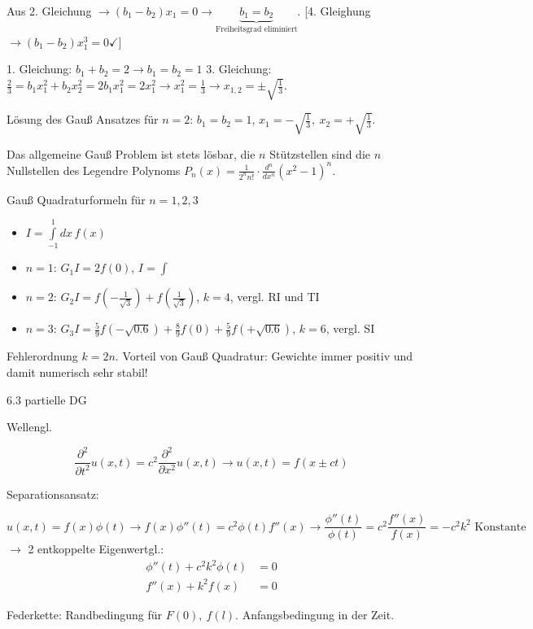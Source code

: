\documentclass[a4paper,ngerman]{scrbook}
\begin{document}
Aus 2. Gleichung $\to (b_1-b_2)x_1 = 0 \to \underbrace{b_1 = b_2}_{\text{Freiheitsgrad eliminiert}}$. [4. Gleighung $\to (b_1-b_2)x_1^3 = 0 \checkmark$]

1. Gleichung: $b_1 + b_2 = 2 \to b_1 = b_2 = 1$
3. Gleichung: $\frac{2}{3} = b_1x_1^2 + b_2x_2^2 = 2b_1 x_1^2 = 2x_1^2 \to x_1^2 = \frac{1}{3} \to x_{1,2} = \pm \sqrt{\frac{1}{3}}$.

Lösung des Gauß Ansatzes für $n=2$: $b_1 = b_2 = 1$, $x_1 = -\sqrt{\frac{1}{3}},\ x_2 = +\sqrt{\frac{1}{3}}$.

Das allgemeine Gauß Problem ist stets lösbar, die $n$ Stützstellen sind die $n$ Nullstellen des Legendre Polynoms $P_n(x) = \frac{1}{2^n n!}\cdot \frac{d^n}{dx^n} (x^2 - 1)^n$.

Gauß Quadraturformeln für $n=1,2,3$

\begin{itemize}
\item $I = \int\limits_{-1}^1 dx\, f(x)$
\item $n=1$: $G_1I = 2f(0)$, $I = \int$
\item $n=2$: $G_2I = f\left(-\frac{1}{\sqrt{3}}\right) + f\left(\frac{1}{\sqrt{3}}\right)$, $k=4$, vergl\@. RI und TI
\item $n=3$: $G_3I = \frac{5}{9} f(-\sqrt{0.6}) + \frac{8}{9} f(0) + \frac{5}{9}f\left(+\sqrt{0.6}\right)$, $k=6$, vergl\@. SI
\end{itemize}

Fehlerordnung $k=2n$. Vorteil von Gauß Quadratur: Gewichte immer positiv und damit numerisch sehr stabil!


\pagebreak

6.3 partielle DG

Wellengl.

\[
\frac{\partial^2}{\partial t^2} u(x,t) = c^2 \frac{\partial^2}{\partial x^2} u(x,t) \to u(x,t) = f(x \pm ct)
\]

Separationsansatz:

\[
u(x,t) = f(x) \phi(t) \to f(x) \phi''(t) = c^2 \phi(t) f''(x) \to \frac{\phi''(t)}{\phi(t)} = c^2 \frac{f''(x)}{f(x)} = -c^2 k^2 \text{ Konstante}
\]
$\to$ 2 entkoppelte Eigenwertgl.:
\begin{align*}
  \phi''(t) + c^2k^2 \phi(t) &= 0\\
  f''(x) +  k^2 f(x) & = 0
\end{align*}

Federkette: Randbedingung für $F(0),\ f(l)$. Anfangsbedingung in der Zeit.
\end{document}
